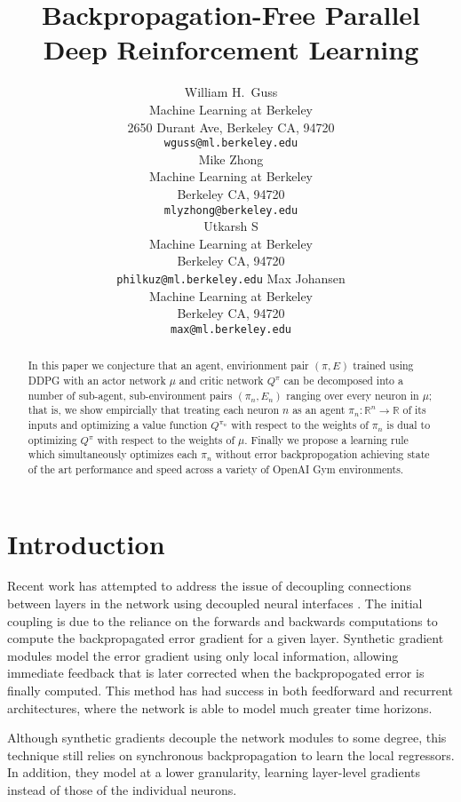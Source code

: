 \documentclass{article} %
\title{Backpropagation-Free Parallel Deep Reinforcement Learning}
\author{
William H.~Guss \\
Machine Learning at Berkeley\\
2650 Durant Ave, Berkeley CA, 94720 \\
\texttt{wguss@ml.berkeley.edu} \\
\And
Mike Zhong \\
Machine Learning at Berkeley \\
Berkeley CA, 94720 \\
\texttt{mlyzhong@berkeley.edu} \\
\And
Utkarsh S \\
Machine Learning at Berkeley \\
Berkeley CA, 94720 \\
\texttt{philkuz@ml.berkeley.edu}
\And
Max Johansen \\
Machine Learning at Berkeley \\
Berkeley CA, 94720 \\
\texttt{max@ml.berkeley.edu}
}
\numberwithin{equation}{subsection}
\numberwithin{theorem}{subsection}
\begin{document}
\maketitle

\begin{abstract}
    In this paper we conjecture that an agent, envirionment pair $(\pi, E)$ trained using DDPG with an actor network $\mu$ and critic network $Q^{\pi}$ can be decomposed into a number of sub-agent, sub-environment pairs  $(\pi_n, E_n)$ ranging over every neuron in $\mu$; that is, we show empircially that treating each neuron $n$ as an agent $\pi_n: \mathbb{R}^n \to \mathbb{R}$ of its inputs and optimizing a value function $Q^{\pi_n}$ with respect to the weights of $\pi_n$ is dual to optimizing $Q^\pi$ with respect to the weights of $\mu$. Finally we propose a learning rule which simultaneously optimizes each $\pi_n$ without error backpropogation achieving state of the art performance and speed across a variety of OpenAI Gym environments.
\end{abstract}
\listoftodos


\section{Introduction}



Recent work has attempted to address the issue of decoupling connections between layers in the network using decoupled neural interfaces \cite{jaderberg2016syngrad}. The initial coupling is due to the reliance on the forwards and backwards computations to compute the backpropagated error gradient for a given layer. Synthetic gradient modules model the error gradient using only local information, allowing immediate feedback that is later corrected when the backpropogated error is finally computed. This method has had success in both feedforward and recurrent architectures, where the network is able to model much greater time horizons.

Although synthetic gradients decouple the network modules to some degree, this technique still relies on synchronous backpropagation to learn the local regressors. In addition, they model at a lower granularity, learning layer-level gradients instead of those of the individual neurons.
\end{document}
